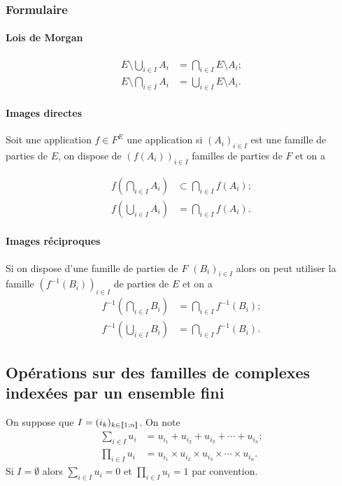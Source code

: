 \subsubsection{Formulaire}
\label{chap3-subsubsec:formulaireensemble}

\paragraph{Lois de Morgan}
\label{chap3-par:morgan}
\begin{align}
  E \setminus \bigcup\limits_{i \in I} A_i &= \bigcap\limits_{i \in I} E 
  \setminus A_i;\\
  E \setminus \bigcap\limits_{i \in I} A_i &= \bigcup\limits_{i \in I} E 
  \setminus A_i.
\end{align}

\paragraph{Images directes}
\label{chap3-par:imagedir}

Soit une application \(f \in F^E\) une application si \((A_i)_{i \in I}\) est 
une famille de parties de \(E\), on dispose de \((f(A_i))_{i \in I}\) familles 
de parties de \(F\) et on a

\begin{align}
  f \left(\bigcap\limits_{i \in I} A_i\right) &\subset \bigcap\limits_{i \in 
  I} f(A_i);\\
    f \left(\bigcup\limits_{i \in I} A_i\right) &= \bigcap\limits_{i \in I} 
    f(A_i).
\end{align}

\paragraph{Images réciproques}
\label{chap3-par:imagerec}

Si on dispose d'une famille de parties de \(F\) \((B_i)_{i \in I}\) alors on 
peut utiliser la famille \((f^{-1}(B_i))_{i \in I}\) de parties de \(E\) et on a
\begin{align}
  f^{-1} \left(\bigcap\limits_{i \in I} B_i\right) &= \bigcap\limits_{i \in I} 
  f^{-1}(B_i);\\
  f^{-1} \left(\bigcup\limits_{i \in I} B_i\right) &= \bigcap\limits_{i \in I} 
  f^{-1}(B_i).
\end{align}

\subsection{Opérations sur des familles de complexes indexées par un ensemble 
fini}
\label{chap3-subsec:operationsfamilles}
On suppose que \(I = (i_k)_{k \in  \mathopen{\llbracket}1\mathclose{}\mathpunct{};n\mathclose{\rrbracket}}\). On note 
\begin{align}
  \sum_{i \in I} u_i &= u_{i_1} +u_{i_2} +u_{i_3} + \dotsb +u_{i_n};\\
  \prod_{i \in I} u_i &= u_{i_1} \times u_{i_2} \times u_{i_3} \times \dotsm 
  \times u_{i_n}.
\end{align}
Si \(I = \emptyset\) alors \(\sum_{i \in I} u_i = 0\) et \(\prod_{i \in I} u_i = 
1\) par convention.

